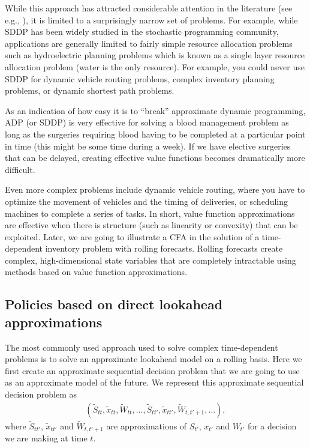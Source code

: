 \documentclass[11pt,oneside,fleqn,reqno,titlepage]{article}
\newcommand{\bns}{\begin{eqnarray*}}
\newcommand{\ens}{\end{eqnarray*}}
\newcounter{example}
\def \xtilde{{\tilde x}}
\def \Stilde{{\tilde S}}
\def \Wtilde{{\tilde W}}
\begin{document}
While this approach has attracted considerable attention in the literature (see e.g., \cite{powell2004learning,PowellADP2011,bertsekas2011dynamic, Sutton2018}), it is limited to a surprisingly narrow set of problems.  For example, while SDDP has been widely studied in the stochastic programming community, applications are generally limited to fairly simple resource allocation problems such as hydroelectric planning problems \citep{Shapiro2011,Philpott2012} which is known as a single layer resource allocation problem (water is the only resource).  For example, you could never use SDDP for dynamic vehicle routing problems, complex inventory planning problems, or dynamic shortest path problems.

As an indication of how easy it is to ``break'' approximate dynamic programming, ADP (or SDDP) is very effective for solving a blood management problem as long as the surgeries requiring blood having to be completed at a particular point in time (this might be some time during a week).  If we have elective surgeries that can be delayed, creating effective value functions becomes dramatically more difficult.


Even more complex problems include dynamic vehicle routing, where you have to optimize the movement of vehicles and the timing of deliveries, or scheduling machines to complete a series of tasks.  In short, value function approximations are effective when there is structure (such as linearity or convexity) that can be exploited.  Later, we are going to illustrate a CFA in the solution of a time-dependent inventory problem with rolling forecasts.  Rolling forecasts create complex, high-dimensional state variables that are completely intractable using methods based on value function approximations.




\subsection{Policies based on direct lookahead approximations}
\label{sec:dlapolicy}
The most commonly used approach used to solve complex time-dependent problems is to solve an approximate lookahead model on a rolling basis.  Here we first create an approximate sequential decision problem that we are going to use as an approximate model of the future.  We represent this approximate sequential decision problem as
\bns
(\Stilde_{tt},\xtilde_{tt},\Wtilde_{tt}, \ldots, \Stilde_{tt'},\xtilde_{tt'},\Wtilde_{t,t'+1}, \ldots),
\ens
where $\Stilde_{tt'}$, $\xtilde_{tt'}$ and $\Wtilde_{t,t'+1}$ are approximations of $S_{t'}$, $x_{t'}$ and $W_{t'}$ for a decision we are making at time $t$.
\end{document}
